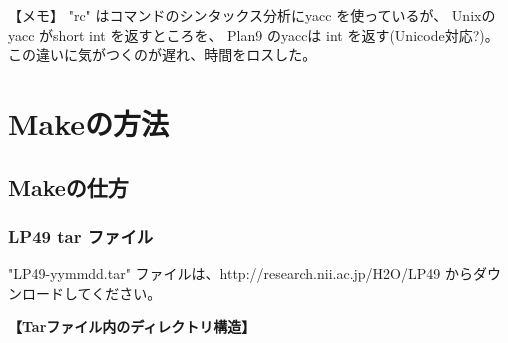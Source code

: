 【メモ】 "rc" はコマンドのシンタックス分析にyacc を使っているが、 
          Unixのyacc がshort int を返すところを、
          Plan9 のyaccは int を返す(Unicode対応?)。
         この違いに気がつくのが遅れ、時間をロスした。   


\newpage
\part{Makeの方法}

\chapter{Makeの仕方}  
\section{ LP49 tar ファイル}

      "LP49-yymmdd.tar" ファイルは、http://research.nii.ac.jp/H2O/LP49 からダウンロードしてください。

{\bf 【Tarファイル内のディレクトリ構造】}\\

